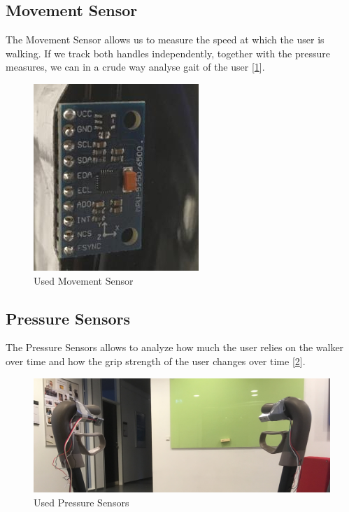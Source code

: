 \subsection{Movement Sensor}
The Movement Sensor allows us to measure the speed at which the user is walking. If we track both handles independently, together with the pressure measures, we can in a crude way analyse gait of the user [\ref{fig:walkerpictures_movement}].

\begin{figure}[h!]
	\centering
	\includegraphics[width=0.7\linewidth]{gfx/walkerpictures/movement}
	\caption{Used Movement Sensor}
	\label{fig:walkerpictures_movement}
\end{figure}

\subsection{Pressure Sensors}
The Pressure Sensors allows to analyze how much the user relies on the walker over time and how the grip strength of the user changes over time [\ref{fig:walkerpictures_pressure}].
\begin{figure}[h!]
	\centering
	\includegraphics[width=0.7\linewidth]{gfx/walkerpictures/pressure}
	\caption{Used Pressure Sensors}
	\label{fig:walkerpictures_pressure}
\end{figure}


